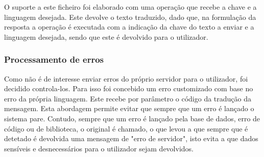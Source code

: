 O suporte a este ficheiro foi elaborado com uma operação que recebe a chave e a linguagem desejada. Este devolve o texto traduzido, dado que, na formulação da resposta a operação é executada com a indicação da chave do texto a enviar e a linguagem desejada, sendo que este é devolvido para o utilizador.

\subsubsection{Processamento de erros}
Como não é de interesse enviar erros do próprio servidor para o utilizador, foi decidido controla-los. Para isso foi concebido um erro customizado com base no erro da própria linguagem. Este recebe por parâmetro o código da tradução da mensagem. Esta abordagem permite evitar que sempre que um erro é lançado o sistema pare. Contudo, sempre que um erro é lançado pela base de dados, erro de código ou de biblioteca, o original é chamado, o que levou a que sempre que é detetado é devolvida uma mensagem de "erro de servidor", isto evita a que dados sensíveis e desnecessários para o utilizador sejam devolvidos.